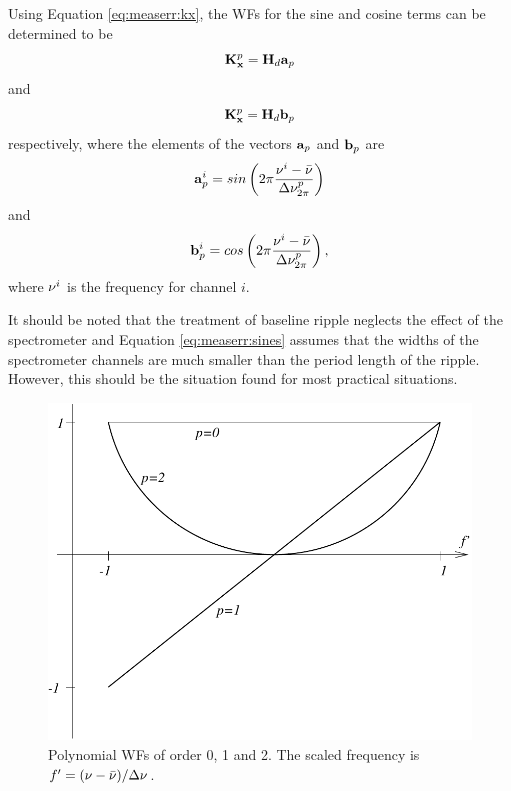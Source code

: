  Using Equation \ref{eq:measerr:kx}, the
 WFs for the sine and cosine terms can be determined to be
 \begin{equation}
   \mathbf{K}_{\mathbf{x}}^p = \mathbf{H}_d \mathbf{a}_p
 \end{equation}
 and
 \begin{equation}
   \mathbf{K}_{\mathbf{x}}^p = \mathbf{H}_d \mathbf{b}_p
 \end{equation}
 respectively, where the elements of the vectors $\mathbf{a}_p$ and
 $\mathbf{b}_p$ are
 \begin{equation}
   \mathbf{a}_p^i = sin\left(2\pi\frac{\nu^i-\bar{\nu}}{\Delta \nu_{2\pi}^p}\right) 
 \end{equation}
 and
 \begin{equation}
   \mathbf{b}_p^i = cos\left(2\pi\frac{\nu^i-\bar{\nu}}{\Delta \nu_{2\pi}^p}\right),
 \end{equation}
 where $\nu^i$ is the frequency for channel $i$.
 
 It should be noted that the treatment of baseline ripple neglects the
 effect of the spectrometer and Equation \ref{eq:measerr:sines} assumes
 that the widths of the spectrometer channels are much smaller than
 the period length of the ripple. However, this should be the
 situation found for most practical situations.



 \label{sec:measerr:pol}
 
 \begin{figure}
  \begin{center}
   \begin{minipage}[c]{0.65\textwidth}
    \centering
    \includegraphics*[width=0.99\hsize]{Figs/kpol}
   \end{minipage}%
   \hspace{0.03\textwidth}%
   \begin{minipage}[c]{0.30\textwidth}
    \centering
    \caption{Polynomial WFs of order 0, 1 and 2. The scaled frequency is
             \mbox{$f'=(\nu-\bar{\nu})/\Delta \nu$.}}
    \label{fig:measerr:kpol}
   \end{minipage}
  \end{center}
 \end{figure}           

